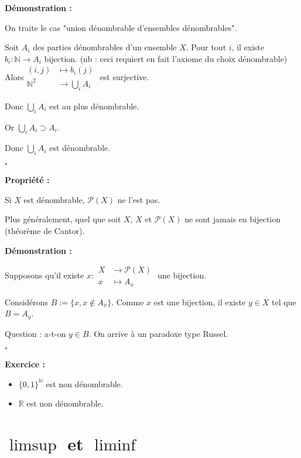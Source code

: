 \documentclass[10pt,a4paper,notitlepage ]{report}
\newcommand{\1}{\mathds 1}
\newcounter{th}
\newenvironment{propriete}[1][]{
	\begin{tcolorbox}
		\textbf{Propriété #1 : }
}
{\end{tcolorbox}}
\newenvironment{demo}[1][]{

	\textbf{Démonstration #1 :}
}{\begin{flushright}
	$\square$
\end{flushright}
}
\newenvironment{exo}{
	
	\textbf{Exercice :} }{}
\begin{document}
\begin{demo}
	On traite le cas "union dénombrable d'ensembles dénombrables".
	
	Soit $A_i$ des parties dénombrables d'un ensemble $X$.
	Pour tout $i$, il existe $b_i : \mathbb N \rightarrow A_i$ bijection. (nb : ceci requiert en fait l'axiome du choix dénombrable)
	Alors$ \begin{aligned}
		(i,j) &\mapsto b_i(j) \\
		\mathbb N ^2 & \rightarrow \underset{i}{\bigcup} A_i
	\end{aligned}$ est surjective.

Donc $\underset{i}{\bigcup}A_i$ est au plus dénombrable.

Or $\underset{i}{\bigcup}A_i \supset A_i$.

Donc $\underset{i}{\bigcup} A_i$ est dénombrable.
\end{demo}

\begin{propriete}
	Si $X$ est dénombrable, $\mathcal P(X)$ ne l'est pas.
	
	Plus généralement, quel que soit $X$, $X$ et $\mathcal P(X)$ ne sont jamais en bijection (théorème de Cantor).
\end{propriete}

\begin{demo}
	Supposons qu'il existe $x: \begin{aligned} X & \rightarrow \mathcal P(X) \\
		x & \mapsto A_x \end{aligned}$ une bijection.
	
	Considérons $B := \{x, x\notin A_x\}$. Comme $x$ est une bijection, il existe $y \in X$ tel que $B = A_y$.
	
	Question : a-t-on $y\in B$. On arrive à un paradoxe type Russel.
\end{demo}

\begin{exo}
\begin{itemize}	
	\item $\{0,1\}^\mathbb N$ est non dénombrable.
	
	\item $\mathbb R$ est non dénombrable.
	
\end{itemize}
\end{exo}

\section{$\limsup$ et $\liminf$}
\end{document}
